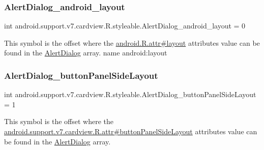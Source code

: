 \subsubsection{\texorpdfstring{Alert\+Dialog\+\_\+android\+\_\+layout}{AlertDialog\_android\_layout}}
{\footnotesize\ttfamily int android.\+support.\+v7.\+cardview.\+R.\+styleable.\+Alert\+Dialog\+\_\+android\+\_\+layout = 0\hspace{0.3cm}{\ttfamily [static]}}

This symbol is the offset where the \hyperlink{}{android.\+R.\+attr\#layout} attribute\textquotesingle{}s value can be found in the \hyperlink{classandroid_1_1support_1_1v7_1_1cardview_1_1R_1_1styleable_a44fc620801e3af4c8b4e7ef1fee84a2d}{Alert\+Dialog} array.  name android\+:layout \mbox{\label{classandroid_1_1support_1_1v7_1_1cardview_1_1R_1_1styleable_a4ec06892d36ab96c77fe88a60ac4ad6d}} 
\subsubsection{\texorpdfstring{Alert\+Dialog\+\_\+button\+Panel\+Side\+Layout}{AlertDialog\_buttonPanelSideLayout}}
{\footnotesize\ttfamily int android.\+support.\+v7.\+cardview.\+R.\+styleable.\+Alert\+Dialog\+\_\+button\+Panel\+Side\+Layout = 1\hspace{0.3cm}{\ttfamily [static]}}

This symbol is the offset where the \hyperlink{classandroid_1_1support_1_1v7_1_1cardview_1_1R_1_1attr_ab3f73fc354c0fdde77226fff7a827c64}{android.\+support.\+v7.\+cardview.\+R.\+attr\#button\+Panel\+Side\+Layout} attribute\textquotesingle{}s value can be found in the \hyperlink{classandroid_1_1support_1_1v7_1_1cardview_1_1R_1_1styleable_a44fc620801e3af4c8b4e7ef1fee84a2d}{Alert\+Dialog} array.

